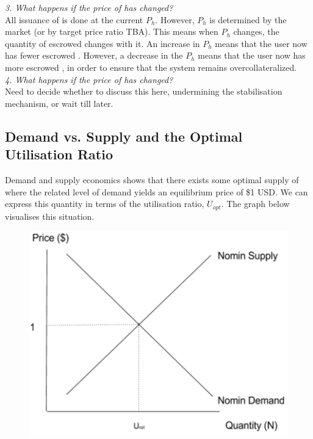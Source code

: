 \noindent \emph{3. What happens if the price of \HAV{} has changed?} \\

\noindent All issuance of \NOM{} is done at the current $P_h$. However, $P_h$ is determined by the market (or by target price ratio TBA). This means when $P_h$ changes, the quantity of escrowed \HAV{} changes with it. An increase in $P_h$ means that the user now has fewer escrowed \HAV{}. However, a decrease in the $P_h$ means that the user now has more escrowed \HAV{}, in order to ensure that the system remains overcollateralized. \\ 

\noindent \emph{4. What happens if the price of \NOM{} has changed?} \\ 

\noindent Need to decide whether to discuss this here, undermining the stabilisation mechanism, or wait till later.

\newpage

\subsection{Demand vs. Supply and the Optimal Utilisation Ratio} 

\noindent Demand and supply economics shows that there exists some optimal supply of \NOM{} where the related level of demand yields an equilibrium price of \$1 USD. We can express this quantity in terms of the utilisation ratio, $U_{opt}$. The graph below visualises this situation. \\

\begin{figure}[h!]
    \centering
    \includegraphics[width=.7\textwidth]{img/nomin-demand-vs-supply}
\end{figure}

